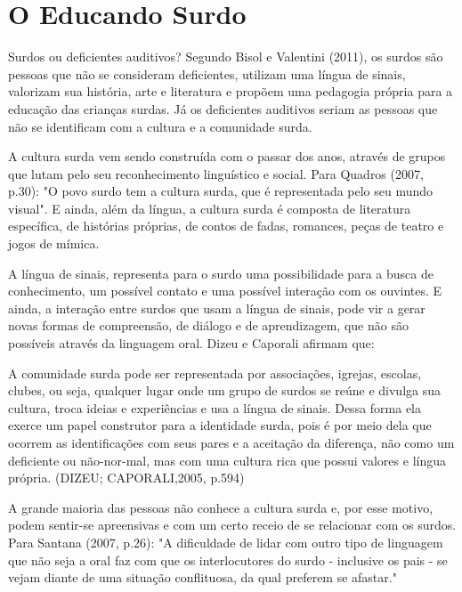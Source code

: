 \documentclass[brasil]{abnt}
\begin{document}
\chapter{O Educando Surdo}
		Surdos ou deficientes auditivos? Segundo Bisol e Valentini (2011), os surdos são pessoas que não se consideram deficientes, utilizam uma língua de sinais, valorizam sua história, arte e literatura 
		e propõem uma pedagogia própria para a educação das crianças surdas. Já os deficientes auditivos seriam as pessoas que não se identificam com a cultura e a comunidade surda. 
				
		A cultura surda vem sendo construída com o passar dos anos, através de grupos que lutam pelo seu reconhecimento linguístico e social. 
		Para Quadros (2007, p.30): "O povo surdo tem a cultura surda, que é representada pelo seu mundo visual". E ainda, além da língua, a cultura surda é composta de literatura 
		específica, de histórias próprias, de contos de fadas, romances, peças de teatro e jogos de mímica.
		
		A língua de sinais, representa para o surdo uma possibilidade para a busca de conhecimento, um possível contato e uma possível interação com os ouvintes.
		E ainda, a interação entre surdos que usam a língua de sinais, pode vir a gerar novas formas de compreensão, de diálogo e de aprendizagem, que não são possíveis através da linguagem oral.
		Dizeu e Caporali afirmam que:
		
			\begin{citacao}A comunidade surda pode ser representada por associações, igrejas, escolas, clubes, ou seja, qualquer lugar onde um grupo de surdos se reúne e divulga sua cultura, troca ideias e 
							experiências e usa a língua de sinais. Dessa forma ela exerce um papel construtor para a identidade surda, pois é por meio dela que ocorrem as identificações com seus pares e a 
							aceitação da diferença, não como um deficiente ou não-nor-mal, mas com uma cultura rica que possui valores e língua própria. (DIZEU; CAPORALI,2005, p.594)
			\end{citacao}
			
		A grande maioria das pessoas não conhece a cultura surda e, 
		por esse motivo, podem sentir-se apreensivas e com um certo receio de 
		se relacionar com os surdos. Para Santana (2007, p.26): "A dificuldade de lidar 
		com outro tipo de linguagem que não seja a oral faz com que os interlocutores do surdo - inclusive os pais - se vejam diante de uma situação conflituosa, da qual preferem se afastar."		
		
\end{document}

